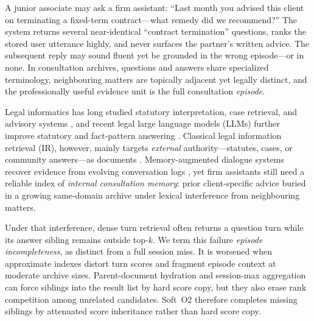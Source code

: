 \documentclass[preprint,12pt,authoryear]{elsarticle}
\begin{document}
A junior associate may ask a firm assistant: ``Last month you advised this client on terminating a fixed-term contract---what remedy did we recommend?''
The system returns several near-identical ``contract termination'' questions, ranks the stored user utterance highly, and never surfaces the partner's written advice.
The subsequent reply may sound fluent yet be grounded in the wrong episode---or in none.
In consultation archives, questions and answers share specialized terminology, neighbouring matters are topically adjacent yet legally distinct, and the professionally useful evidence unit is the full consultation \emph{episode}.

Legal informatics has long studied statutory interpretation, case retrieval, and advisory systems \cite{martinezgil2023survey, ashley2017artificial}, and recent legal large language models (LLMs) further improve statutory and fact-pattern answering \cite{yue2023disclawllm, huang2023lawyer, yue2024lawllm}.
Classical legal information retrieval (IR), however, mainly targets \emph{external} authority---statutes, cases, or community answers---as documents \cite{askari2024legalqa, louis2024lleqa, liu2022query, zhang2024event}.
Memory-augmented dialogue systems recover evidence from evolving conversation logs \cite{wu2025longmemeval, maharana2024evaluating, packer2023memgpt}, yet firm assistants still need a reliable index of \emph{internal consultation memory}: prior client-specific advice buried in a growing same-domain archive under lexical interference from neighbouring matters.

Under that interference, dense turn retrieval often returns a question turn while its answer sibling remains outside top-$k$.
We term this failure \emph{episode incompleteness}, as distinct from a full session miss.
It is worsened when approximate indexes distort turn scores and fragment episode context at moderate archive sizes.
Parent-document hydration and session-max aggregation can force siblings into the result list by hard score copy, but they also erase rank competition among unrelated candidates.
Soft~O2 therefore completes missing siblings by attenuated score inheritance rather than hard score copy.
\end{document}
